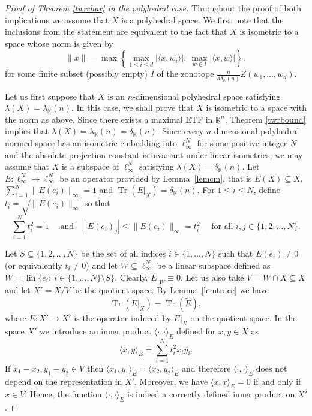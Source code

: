 \documentclass[12pt, reqno]{amsart}
\theoremstyle{definition}
\theoremstyle{remark}
\numberwithin{equation}{section}
\DeclareMathOperator{\lin}{lin}
\DeclareMathOperator{\tr}{Tr}
\begin{document}
\begin{proof}[Proof of Theorem \ref{twrchar} in the polyhedral case] Throughout the proof of both implications we assume that $X$ is a polyhedral space. We first note that the inclusions from the statement are equivalent to the fact that $X$ is isometric to a space whose norm is given by
\begin{equation}
\label{normateza}
\|x\| = \max \left \{ \max_{1 \leq i \leq d} | \langle x, w_i \rangle |, \: \max_{w \in I} |\langle x, w \rangle| \right \},
\end{equation}
for some finite subset (possibly empty) $I$ of the zonotope $\frac{n}{d\delta_{\mathbb{K}}(n)} Z(w_1, \ldots, w_d)$.


Let us first suppose that $X$ is an $n$-dimensional polyhedral space satisfying $\lambda(X) = \lambda_{\mathbb{K}}(n)$. In this case, we shall prove that $X$ is isometric to a space with the norm as above. Since there exists a maximal ETF in $\mathbb{K}^n$, Theorem \ref{twrbound} implies that $\lambda(X)=\lambda_{\mathbb{K}}(n)=\delta_{\mathbb{K}}(n)$. Since every $n$-dimensional polyhedral normed space has an isometric embedding into $\ell^N_{\infty}$ for some positive integer $N$ and the absolute projection constant is invariant under linear isometries, we may assume that $X$ is a subspace of $\ell_\infty^N$ satisfying $\lambda(X) = \delta_{\mathbb{K}}(n)$. Let $E:\ell_\infty^N\to\ell_\infty^N$ be an operator provided by Lemma~\ref{lemcm}, that is $E(X) \subseteq X$, $\sum_{i=1}^{N} \|E(e_i)\|_{\infty} = 1$ and $\tr(E|_X)=\delta_{\mathbb{K}}(n)$. For $1\le i\le N$, define $t_i = \sqrt{\|E(e_i)\|_{\infty}}$ so that
$$\sum_{i=1}^{N} t_i^2 = 1 \quad \text{ and } \quad |E(e_i)_j| \leq \|E(e_i)\|_{\infty} = t_i^2 \quad \text { for all } i, j \in \{1, 2, \ldots, N\}.$$

Let $S \subseteq \{1, 2, \ldots, N\}$ be the set of all indices $i \in \{1, \ldots, N\}$ such that $E(e_i) \neq 0$ (or equivalently $t_i \neq 0$) and let $W \subseteq \ell_{\infty}^N$ be a linear subspace defined as $W = \lin \{e_i: \ i \in \{1, \ldots, N\} \setminus S\}.$ Clearly, $E|_W \equiv 0$. Let us also take $V = W \cap X \subseteq X$ and let $X'=X/V$ be the quotient space. By Lemma~\ref{lemtrace} we have
\begin{equation}
\label{trace}
\tr(E|_X) = \tr(\widetilde{E}),
\end{equation}
where $\widetilde{E}: X' \to X'$ is the operator induced by $E|_X$ on the quotient space. In the space $X'$ we introduce an inner product $\langle \cdot, \cdot \rangle_E$ defined for $x, y \in X$ as
$$\langle x, y \rangle_E = \sum_{i=1}^{N} t_i^2 x_i \overline{y_i} .$$
If $x_1-x_2, y_1-y_2 \in V$ then $\langle x_1, y_1 \rangle_E = \langle x_2, y_2 \rangle_E$ and therefore $\langle \cdot, \cdot \rangle_E$ does not depend on the representation in $X'$. Moreover, we have $\langle x, x \rangle_E = 0$ if and only if $x \in V$. Hence, the function $\langle \cdot, \cdot \rangle_E$ is indeed a correctly defined inner product on $X'$.


\end{proof}
\end{document}
